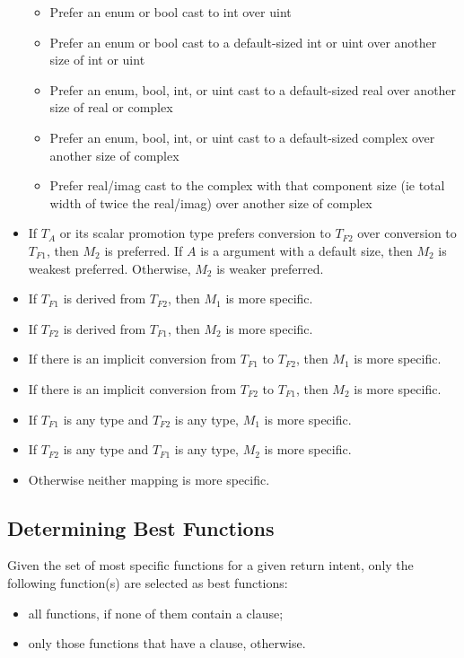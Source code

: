 \begin{itemize}
\begin{itemize}
  \item Prefer an enum or bool cast to int over uint
  \item Prefer an enum or bool cast to a default-sized int or uint over another
    size of int or uint
  \item Prefer an enum, bool, int, or uint cast to a default-sized real
    over another size of real or complex
  \item Prefer an enum, bool, int, or uint cast to a default-sized
    complex over another size of complex
  \item Prefer real/imag cast to the complex with that component size (ie
    total width of twice the real/imag) over another size of complex

\end{itemize}

\item
If $T_A$ or its scalar promotion type prefers conversion to $T_{F2}$
over conversion to $T_{F1}$, then $M_2$ is preferred. If $A$ is a
 argument with a default size, then $M_2$ is weakest
preferred. Otherwise, $M_2$ is weaker preferred.

\item
 If $T_{F1}$ is derived from $T_{F2}$, then $M_1$ is more specific.
\item
 If $T_{F2}$ is derived from $T_{F1}$, then $M_2$ is more specific.
\item
 If there is an implicit conversion from $T_{F1}$ to $T_{F2}$, then
 $M_1$ is more specific.
\item
 If there is an implicit conversion from $T_{F2}$ to $T_{F1}$, then
 $M_2$ is more specific.
\item
 If $T_{F1}$ is any  type and $T_{F2}$ is any 
 type, $M_1$ is more specific.
\item
 If $T_{F2}$ is any  type and $T_{F1}$ is any 
 type, $M_2$ is more specific.
\item
 Otherwise neither mapping is more specific.
\end{itemize}

\subsection{Determining Best Functions}
\label{Determining_Best_Functions}

Given the set of most specific functions for a given return intent,
only the following function(s) are selected as best functions:
\begin{itemize}
\item all functions, if none of them contain a  clause;
\item only those functions that have a  clause, otherwise.
\end{itemize}

